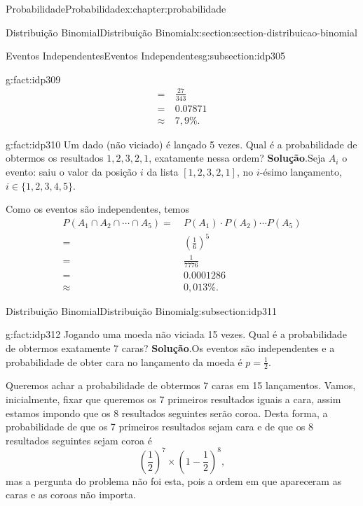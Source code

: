 \documentclass[oneside,10pt,]{book}
\newcommand{\blocktitlefont}{\relax}
\numberwithin{equation}{section}
\newcommand{\amp}{&}
\begin{document}
\begin{chapterptx}{Probabilidade}{}{Probabilidade}{}{}{x:chapter:probabilidade}
\begin{sectionptx}{Distribuição Binomial}{}{Distribuição Binomial}{}{}{x:section:section-distribuicao-binomial}
\begin{subsectionptx}{Eventos Independentes}{}{Eventos Independentes}{}{}{g:subsection:idp305}
\begin{fact}{}{}{g:fact:idp309}
\begin{align*}
= \amp ~\frac{27}{343} \\
= \amp ~ 0.07871 \\
\approx \amp ~ 7,9\%. 
\end{align*}
%
\end{fact}
\begin{fact}{}{}{g:fact:idp310}%
Um dado (não viciado) é lançado 5 vezes. Qual é a probabilidade de obtermos os resultados \(1, 2, 3, 2, 1\), exatamente nessa ordem?%
\textbf{\blocktitlefont Solução}.\quad{}Seja \(A_i\) o evento: saiu o valor da posição \(i\) da lista \([1, 2, 3, 2, 1]\), no \(i\)-ésimo lançamento, \(i\in\{1, 2, 3, 4, 5\}\).%
\par
Como os eventos são independentes, temos%
\begin{align*}
P(A_1\cap A_2\cap \cdots \cap A_{5}) = \amp ~ P(A_1)\cdot P(A_2)\cdots P(A_{5}) \\
= \amp ~ \left(\frac{1}{6}\right)^{5} \\
= \amp ~\frac{1}{7776} \\
= \amp ~ 0.0001286 \\
\approx \amp ~ 0,013\%. 
\end{align*}
%
\end{fact}
\end{subsectionptx}
%
%
\typeout{************************************************}
\typeout{************************************************}
%
\begin{subsectionptx}{Distribuição Binomial}{}{Distribuição Binomial}{}{}{g:subsection:idp311}
\begin{fact}{}{}{g:fact:idp312}%
Jogando uma moeda não viciada 15 vezes. Qual é a probabilidade de obtermos exatamente 7 caras?%
\textbf{\blocktitlefont Solução}.\quad{}Os eventos são independentes e a probabilidade de obter cara no lançamento da moeda é \(p=\frac{1}{2}\).%
\par
Queremos achar a probabilidade de obtermos 7 caras em 15 lançamentos. Vamos, inicialmente, fixar que queremos os 7 primeiros resultados iguais a cara, assim estamos impondo que os 8 resultados seguintes serão coroa. Desta forma, a probabilidade de que os 7 primeiros resultados sejam cara e de que os 8 resultados seguintes sejam coroa é %
\begin{equation*}
\left(\frac{1}{2}\right)^7 \times \left(1 - \frac{1}{2}\right)^{8},
\end{equation*}
mas a pergunta do problema não foi esta, pois a ordem em que apareceram as caras e as coroas não importa.%

\end{fact}
\end{subsectionptx}
\end{sectionptx}
\end{chapterptx}
\end{document}
